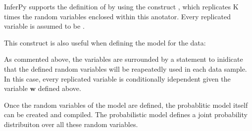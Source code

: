 \documentclass[letterpaper,10pt,english]{sphinxmanual}
\begin{document}
InferPy supports the definition of  by using the
construct , which replicates K times the
random variables enclosed within this anotator. Every replicated
variable is assumed to be .

This  construct is also useful when
defining the model for the data:

\begin{sphinxVerbatim}[commandchars=\\\{\}]
  

 
          
           

\end{sphinxVerbatim}

As commented above, the variables are surrounded by a
 statement to inidicate that the defined random variables will
be reapeatedly used in each data sample. In this case, every replicated
variable is conditionally idependent given the variable \(\mathbf{w}\)
defined above.

Once the random variables of the model are defined, the probablitic
model itself can be created and compiled. The probabilistic model
defines a joint probability distribuiton over all these random
variables.

\begin{sphinxVerbatim}[commandchars=\\\{\}]
   

    \PYG{p}{[}\PYG{p}{]}

  
\end{sphinxVerbatim}
\end{document}

